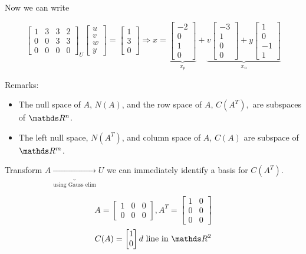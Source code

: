 Now we can write

\[
  \begin{bmatrix}
    1 & 3 & 3 & 2 \\
    0 & 0 & 3 & 3 \\
    0 & 0 & 0 & 0
  \end{bmatrix}_U 
  \begin{bmatrix}
    u \\ v \\ w \\y
  \end{bmatrix} =
  \begin{bmatrix}
    1 \\ 3 \\ 0
  \end{bmatrix} \Rightarrow
  x = \underbrace{\begin{bmatrix}
    -2 \\ 0 \\ 1 \\ 0
  \end{bmatrix}}_{x_p}+
  \underbrace{v \begin{bmatrix}
    -3 \\ 1 \\ 0 \\0
  \end{bmatrix} + 
  y \begin{bmatrix}
    1 \\ 0 \\ -1 \\ 1
  \end{bmatrix}}_{x_n}
\]

Remarks:
\begin{itemize}
  \item The null space of $A$, $N(A)$, and the row space of $A$, $C(A^T),$ are subspaces of $\bbR^n$.
  \item The left null space, $N(A^T)$, and column space of $A$, $C(A)$ are subspace of $\bbR^m$.
\end{itemize}

Transform $A \underbrace{\rightarrow}_\text{using Gauss elim} U$ we can immediately identify a basis for $C(A^T)$.

\[
  A = \begin{bmatrix}
    1 & 0 & 0 \\ 0 & 0 & 0
  \end{bmatrix},
  A^T = \begin{bmatrix}
    1 & 0 \\ 0 & 0 \\ 0 & 0
  \end{bmatrix}
\]
\[
  C(A) = \begin{bmatrix}
    1 \\ 0
  \end{bmatrix}d \text{ line in } \bbR^2
\]

